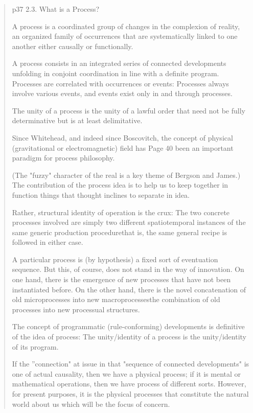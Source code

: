 \documentclass[a4paper]{Thesis}
\begin{document}
\begin{quotation}
	p37
	2.3. What is a Process?
	
	A process is a
	coordinated group of changes in the complexion of reality, an organized family of
	occurrences that are systematically linked to one another either causally or functionally.
	
	A process consists in an
	integrated series of connected developments unfolding in conjoint coordination in line
	with a definite program. Processes are correlated with occurrences or events: Processes
	always involve various events, and events exist only in and through processes.
	
	The unity of a process is the unity of a lawful
	order that need not be fully determinative but is at least delimitative.
	
	Since Whitehead, and indeed since Boscovitch, the concept of physical (gravitational or
	electromagnetic) field has
	Page 40
	been an important paradigm for process philosophy.
	
	(The "fuzzy" character
	of the real is a key theme of Bergson and James.) The contribution of the process idea is
	to help us to keep together in function things that thought inclines to separate in idea.
	
	Rather,
	structural identity of operation is the crux: The two concrete processes involved are
	simply two different spatiotemporal instances of the same generic production
	procedurethat is, the same general recipe is followed in either case.
	
	A particular process is (by hypothesis) a fixed sort of eventuation sequence. But this, of
	course, does not stand in the way of innovation. On one hand, there is the emergence of
	new processes that have not been instantiated before. On the other hand, there is the
	novel concatenation of old microprocesses into new macroprocessesthe combination of
	old processes into new processual structures.
	
	The concept of programmatic (rule-conforming) developments is
	definitive of the idea of process: The unity/identity of a process is the unity/identity of its
	program.
	
	If the ''connection" at issue in that "sequence of connected developments" is
	one of actual causality, then we have a physical process; if it is mental or mathematical
	operations, then we have process of different sorts. However, for present purposes, it is
	the physical processes that constitute the natural world about us which will be the focus
	of concern.
\end{quotation}
\end{document}
